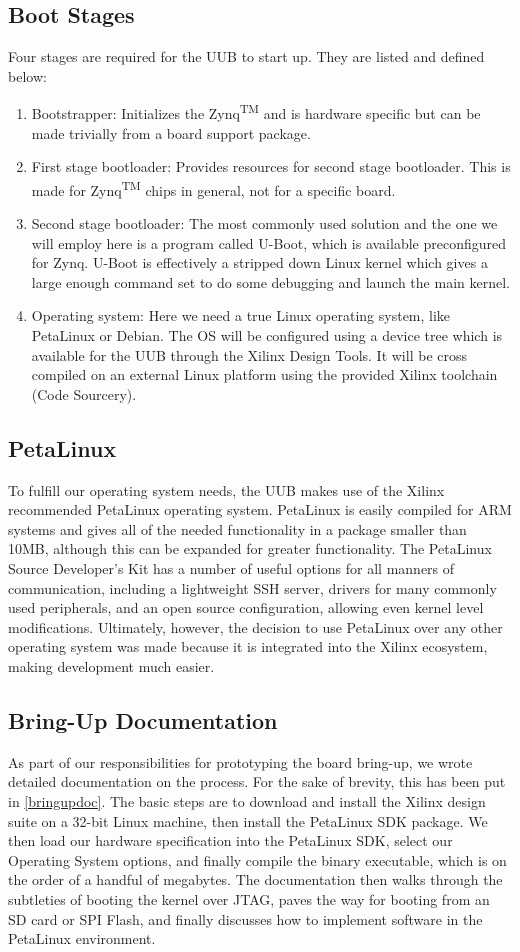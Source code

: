 \subsection{Boot Stages}
Four stages are required for the UUB to start up. They are listed and defined below:
 \begin{enumerate}
 \item Bootstrapper: Initializes the Zynq\textsuperscript{TM} and is hardware specific but can be made trivially from a board support package.
 \item First stage bootloader: Provides resources for second stage bootloader. This is made for Zynq\textsuperscript{TM} chips in general, not for a specific board.
 \item Second stage bootloader: The most commonly used solution and the one we will employ here is a program called U-Boot, which is available preconfigured for Zynq. U-Boot is effectively a stripped down Linux kernel which gives a large enough command set to do some debugging and launch the main kernel.
 \item Operating system: Here we need a true Linux operating system, like PetaLinux or Debian. The OS will be configured using a device tree which is available for the UUB through the Xilinx Design Tools. It will be cross compiled on an external Linux platform using the provided Xilinx toolchain (Code Sourcery).
\end{enumerate}
\subsection{PetaLinux}
To fulfill our operating system needs, the UUB makes use of the Xilinx recommended PetaLinux operating system. PetaLinux is easily compiled for ARM systems and gives all of the needed functionality in a package smaller than 10MB, although this can be expanded for greater functionality. The PetaLinux Source Developer's Kit has a number of useful options for all manners of communication, including a lightweight SSH server, drivers for many commonly used peripherals, and an open source configuration, allowing even kernel level modifications. Ultimately, however, the decision to use PetaLinux over any other operating system was made because it is integrated into the Xilinx ecosystem, making development much easier.
\subsection{Bring-Up Documentation}
As part of our responsibilities for prototyping the board bring-up, we wrote detailed documentation on the process. For the sake of brevity, this has been put in \autoref{bringupdoc}. The basic steps are to download and install the Xilinx design suite on a 32-bit Linux machine, then install the PetaLinux SDK package. We then load our hardware specification into the PetaLinux SDK, select our Operating System options, and finally compile the binary executable, which is on the order of a handful of megabytes. The documentation then walks through the subtleties of booting the kernel over JTAG, paves the way for booting from an SD card or SPI Flash, and finally discusses how to implement software in the PetaLinux environment.

